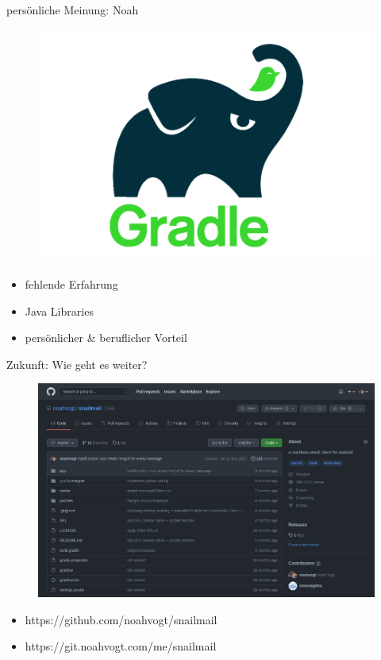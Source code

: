 \documentclass[aspectratio=169]{beamer}
\begin{document}
\begin{frame}[plain]{persönliche Meinung: Noah}
    \begin{varwidth}{.4\textwidth}
        \begin{figure}
            \centering
            \includegraphics[width=.95\textwidth]{media/gradle-logo.png}
        \end{figure}
    \end{varwidth}
    \hfill
    \begin{varwidth}{.5\textwidth}
        \begin{itemize}\pause
            \item fehlende Erfahrung\pause
            \item Java Libraries\pause
            \item persönlicher \& beruflicher Vorteil
        \end{itemize}
    \end{varwidth} 
\end{frame}

\begin{frame}[plain]{Zukunft: Wie geht es weiter?}
    \begin{figure}
        \centering
        \includegraphics[height=.7\textheight]{media/github-repo.jpg}
    \end{figure}
    \begin{itemize}
        \centering
        \item https://github.com/noahvogt/snailmail
        \item https://git.noahvogt.com/me/snailmail
    \end{itemize}
\end{frame}
\end{document}

